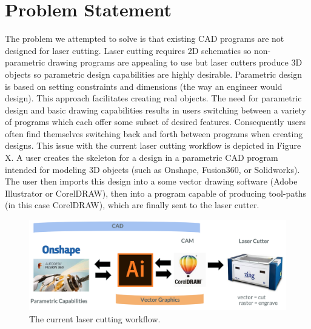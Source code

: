\section{Problem Statement}


The problem we attempted to solve is that existing CAD programs are not designed for laser cutting. Laser cutting requires 2D schematics so non-parametric drawing programs are appealing to use but laser cutters produce 3D objects so parametric design capabilities are highly desirable. Parametric design is based on setting constraints and dimensions (the way an engineer would design). This approach facilitates creating real objects. The need for parametric design and basic drawing capabilities results in users switching between a variety of programs which each offer some subset of desired features. Consequently users often find themselves switching back and forth between programs when creating designs. This issue with the current laser cutting workflow is depicted in Figure X. A user creates the skeleton for a design in a parametric CAD program intended for modeling 3D objects (such as Onshape, Fusion360, or Solidworks). The user then imports this design into a some vector drawing software (Adobe Illustrator or CorelDRAW), then into a program capable of producing tool-paths (in this case CorelDRAW), which are finally sent to the laser cutter.

\begin{figure}[!h]
  \includegraphics[width=\linewidth]{laserCuttingWorkflow.jpg}
  \caption{The current laser cutting workflow.}
  \label{fig:laserCuttingWorkflow}
\end{figure}


